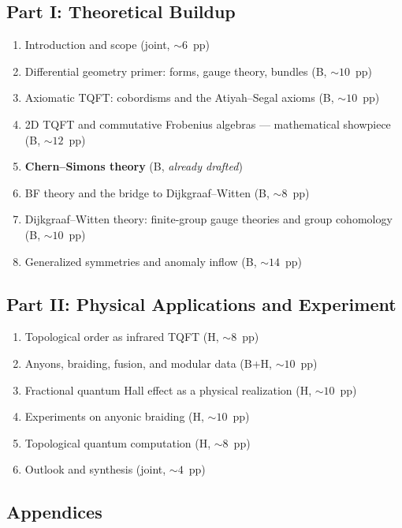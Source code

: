 \documentclass[11pt]{article}
\begin{document}
\subsection{Part I: Theoretical Buildup}

\begin{enumerate}[leftmargin=2em]
\item Introduction and scope (joint, $\sim 6$~pp)
\item Differential geometry primer: forms, gauge theory, bundles (B, $\sim 10$~pp)
\item Axiomatic TQFT: cobordisms and the Atiyah--Segal axioms (B, $\sim 10$~pp)
\item 2D TQFT and commutative Frobenius algebras --- mathematical showpiece (B, $\sim 12$~pp)
\item \textbf{Chern--Simons theory} (B, \emph{already drafted})
\item BF theory and the bridge to Dijkgraaf--Witten (B, $\sim 8$~pp)
\item Dijkgraaf--Witten theory: finite-group gauge theories and group cohomology (B, $\sim 10$~pp)
\item Generalized symmetries and anomaly inflow (B, $\sim 14$~pp)
\end{enumerate}

\subsection{Part II: Physical Applications and Experiment}

\begin{enumerate}[leftmargin=2em,start=9]
\item Topological order as infrared TQFT (H, $\sim 8$~pp)
\item Anyons, braiding, fusion, and modular data (B+H, $\sim 10$~pp)
\item Fractional quantum Hall effect as a physical realization (H, $\sim 10$~pp)
\item Experiments on anyonic braiding (H, $\sim 10$~pp)
\item Topological quantum computation (H, $\sim 8$~pp)
\item Outlook and synthesis (joint, $\sim 4$~pp)
\end{enumerate}

\subsection{Appendices}
\end{document}
